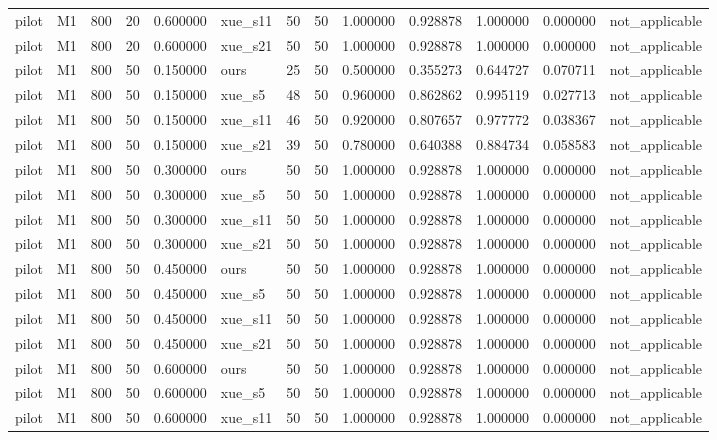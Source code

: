 \begin{longtable}{llrrrlrrrrrrl}
pilot & M1 & 800 & 20 & 0.600000 & xue\_s11 & 50 & 50 & 1.000000 & 0.928878 & 1.000000 & 0.000000 & not\_applicable \\
pilot & M1 & 800 & 20 & 0.600000 & xue\_s21 & 50 & 50 & 1.000000 & 0.928878 & 1.000000 & 0.000000 & not\_applicable \\
pilot & M1 & 800 & 50 & 0.150000 & ours & 25 & 50 & 0.500000 & 0.355273 & 0.644727 & 0.070711 & not\_applicable \\
pilot & M1 & 800 & 50 & 0.150000 & xue\_s5 & 48 & 50 & 0.960000 & 0.862862 & 0.995119 & 0.027713 & not\_applicable \\
pilot & M1 & 800 & 50 & 0.150000 & xue\_s11 & 46 & 50 & 0.920000 & 0.807657 & 0.977772 & 0.038367 & not\_applicable \\
pilot & M1 & 800 & 50 & 0.150000 & xue\_s21 & 39 & 50 & 0.780000 & 0.640388 & 0.884734 & 0.058583 & not\_applicable \\
pilot & M1 & 800 & 50 & 0.300000 & ours & 50 & 50 & 1.000000 & 0.928878 & 1.000000 & 0.000000 & not\_applicable \\
pilot & M1 & 800 & 50 & 0.300000 & xue\_s5 & 50 & 50 & 1.000000 & 0.928878 & 1.000000 & 0.000000 & not\_applicable \\
pilot & M1 & 800 & 50 & 0.300000 & xue\_s11 & 50 & 50 & 1.000000 & 0.928878 & 1.000000 & 0.000000 & not\_applicable \\
pilot & M1 & 800 & 50 & 0.300000 & xue\_s21 & 50 & 50 & 1.000000 & 0.928878 & 1.000000 & 0.000000 & not\_applicable \\
pilot & M1 & 800 & 50 & 0.450000 & ours & 50 & 50 & 1.000000 & 0.928878 & 1.000000 & 0.000000 & not\_applicable \\
pilot & M1 & 800 & 50 & 0.450000 & xue\_s5 & 50 & 50 & 1.000000 & 0.928878 & 1.000000 & 0.000000 & not\_applicable \\
pilot & M1 & 800 & 50 & 0.450000 & xue\_s11 & 50 & 50 & 1.000000 & 0.928878 & 1.000000 & 0.000000 & not\_applicable \\
pilot & M1 & 800 & 50 & 0.450000 & xue\_s21 & 50 & 50 & 1.000000 & 0.928878 & 1.000000 & 0.000000 & not\_applicable \\
pilot & M1 & 800 & 50 & 0.600000 & ours & 50 & 50 & 1.000000 & 0.928878 & 1.000000 & 0.000000 & not\_applicable \\
pilot & M1 & 800 & 50 & 0.600000 & xue\_s5 & 50 & 50 & 1.000000 & 0.928878 & 1.000000 & 0.000000 & not\_applicable \\
pilot & M1 & 800 & 50 & 0.600000 & xue\_s11 & 50 & 50 & 1.000000 & 0.928878 & 1.000000 & 0.000000 & not\_applicable \\

\end{longtable}
